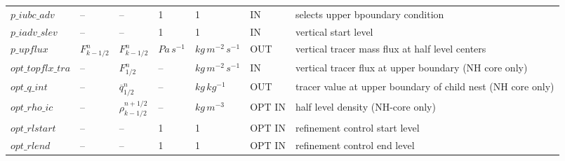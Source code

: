 \begin{landscape}
\begin{singlespacing}
\begin{longtable}{p{2.9cm}|x{2.9cm}|x{2.9cm}|x{1.9cm}|x{1.9cm}|x{1.7cm}|p{7.3cm}}
$p\_iubc\_adv$         &  --                              &  --                          &   1                 &  1                     &  IN        &  selects upper bpoundary condition \\
$p\_iadv\_slev$        &  --                              &  --                          &   1                 &  1                     &  IN        &  vertical start level \\
$p\_upflux$            &  $F^{n}_{k-1/2}$                 &  $F^{n}_{k-1/2}$             &    $Pa\,s^{-1}$     &  $kg\,m^{-2}\,s^{-1}$  &  OUT       &  vertical tracer mass flux at half level centers\\
$opt\_topflx\_tra$     &  --                              &  $F^{n}_{1/2}$               &    --               &  $kg\,m^{-2}\,s^{-1}$  &  IN        &  vertical tracer flux at upper boundary (NH core only)\\
$opt\_q\_int$          &  --                              &  $\overline{q}^{n}_{1/2}$    &    --               &  $kg\,kg^{-1}$         &  OUT       &  tracer value at upper boundary of child nest (NH core only)\\
$opt\_rho\_ic$         &  --                              &  $\rho_{k-1/2}^{n+1/2}$      &    --               &  $kg\,m^{-3}$          &  OPT IN    &  half level density (NH-core only)\\
$opt\_rlstart$         &  --                              &  --                          &    1                &  1                     &  OPT IN    &  refinement control start level\\
$opt\_rlend$           &  --                              &  --                          &    1                &  1                     &  OPT IN    &  refinement control end level\\

\end{longtable}
\endgroup

\end{singlespacing}

\end{landscape}
\normalsize 




